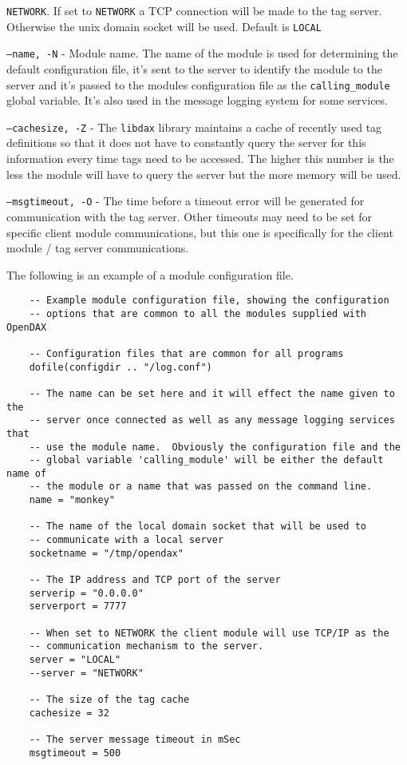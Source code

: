 \begin{list}{}{Command Line Options}
		\texttt{NETWORK}.  If set to \texttt{NETWORK} a TCP connection will be made to
		the tag server.  Otherwise the unix domain socket will be used.  Default is
		\texttt{LOCAL}
		\item[\texttt{--name, -N}] - Module name.  The name of the module is used for
		determining the default configuration file, it's sent to the server to identify
		the module to the server and it's passed to the modules configuration file as
		the \texttt{calling\_module} global variable.  It's also used in the message
		logging system for some services.
		\item[\texttt{--cachesize, -Z}] - The \texttt{libdax} library maintains a cache of
		recently used tag definitions so that it does not have to constantly query the
		server for this information every time tags need to be accessed.  The higher
		this number is the less the module will have to query the server but the more
		memory will be used.
		\item[\texttt{--msgtimeout, -O}] - The time before a timeout error will be generated for
		communication with the tag server.  Other timeouts may need to be set for
		specific client module communications, but this one is specifically for the
		client module / tag server communications.
	\end{list}

	The following is an example of a module configuration file.

	\begin{verbatim}
	-- Example module configuration file, showing the configuration
	-- options that are common to all the modules supplied with OpenDAX

	-- Configuration files that are common for all programs
	dofile(configdir .. "/log.conf")

	-- The name can be set here and it will effect the name given to the
	-- server once connected as well as any message logging services that
	-- use the module name.  Obviously the configuration file and the
	-- global variable 'calling_module' will be either the default name of
	-- the module or a name that was passed on the command line.
	name = "monkey"

	-- The name of the local domain socket that will be used to
	-- communicate with a local server
	socketname = "/tmp/opendax"

	-- The IP address and TCP port of the server
	serverip = "0.0.0.0"
	serverport = 7777

	-- When set to NETWORK the client module will use TCP/IP as the
	-- communication mechanism to the server.
	server = "LOCAL"
	--server = "NETWORK"

	-- The size of the tag cache
	cachesize = 32

	-- The server message timeout in mSec
	msgtimeout = 500
	\end{verbatim}


